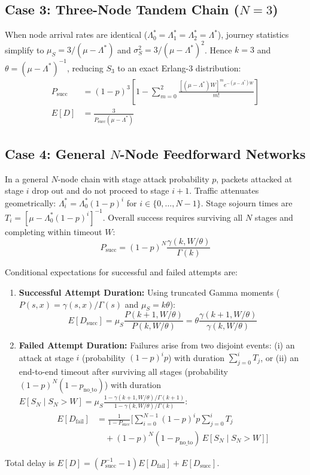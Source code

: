 \documentclass[journal,compsoc]{IEEEtran}
\begin{document}
\subsection{Case 3: Three-Node Tandem Chain ($N=3$)}
When node arrival rates are identical ($\Lambda_0^* = \Lambda_1^* = \Lambda_2^* = \Lambda^*$), journey statistics simplify to $\mu_S = 3/(\mu - \Lambda^*)$ and $\sigma_S^2 = 3/(\mu - \Lambda^*)^2$. Hence $k = 3$ and $\theta = (\mu - \Lambda^*)^{-1}$, reducing $S_3$ to an exact Erlang-3 distribution:
\begin{align}
P_{\text{succ}} &= (1 - p)^3 \left[1 - \sum_{m=0}^2 \frac{[(\mu - \Lambda^*)W]^m e^{-(\mu - \Lambda^*)W}}{m!}\right] \\
E[D] &= \frac{3}{P_{\text{succ}}(\mu - \Lambda^*)}
\end{align}

\subsection{Case 4: General $N$-Node Feedforward Networks}
In a general $N$-node chain with stage attack probability $p$, packets attacked at stage $i$ drop out and do not proceed to stage $i+1$. Traffic attenuates geometrically: $\Lambda_i^* = \Lambda_0^* (1 - p)^i$ for $i \in \{0, \dots, N-1\}$. Stage sojourn times are $T_i = [\mu - \Lambda_0^*(1-p)^i]^{-1}$. Overall success requires surviving all $N$ stages and completing within timeout $W$:
\begin{equation}
P_{\text{succ}} = (1 - p)^N \frac{\gamma(k, W/\theta)}{\Gamma(k)}
\label{eq:psucc_ff}
\end{equation}

Conditional expectations for successful and failed attempts are:
\begin{enumerate}
    \setlength{\itemsep}{1pt}
    \item \textbf{Successful Attempt Duration:} Using truncated Gamma moments ($P(s, x) = \gamma(s, x)/\Gamma(s)$ and $\mu_S = k\theta$):
    \begin{equation}
    E[D_{\text{succ}}] = \mu_S \frac{P(k\!+\!1, W/\theta)}{P(k, W/\theta)} = \theta \frac{\gamma(k\!+\!1, W/\theta)}{\gamma(k, W/\theta)}
    \label{eq:trunc_succ}
    \end{equation}
    \item \textbf{Failed Attempt Duration:} Failures arise from two disjoint events: (i) an attack at stage $i$ (probability $(1-p)^i p$) with duration $\sum_{j=0}^i T_j$, or (ii) an end-to-end timeout after surviving all stages (probability $(1-p)^N (1 - p_{\text{no\_to}})$) with duration $E[S_N \mid S_N > W] = \mu_S \frac{1 - \gamma(k+1, W/\theta)/\Gamma(k+1)}{1 - \gamma(k, W/\theta)/\Gamma(k)}$:
    \begin{align}
    E[D_{\text{fail}}] &= \frac{1}{1 - P_{\text{succ}}} \Bigg[\sum_{i=0}^{N-1} (1-p)^i p \sum_{j=0}^i T_j \nonumber \\
    &\quad + (1-p)^N (1 - p_{\text{no\_to}})\, E[S_N \mid S_N > W]\Bigg]
    \label{eq:delay_fail_ff}
    \end{align}
\end{enumerate}
Total delay is $E[D] = (P_{\text{succ}}^{-1} - 1) E[D_{\text{fail}}] + E[D_{\text{succ}}]$.
\end{document}
